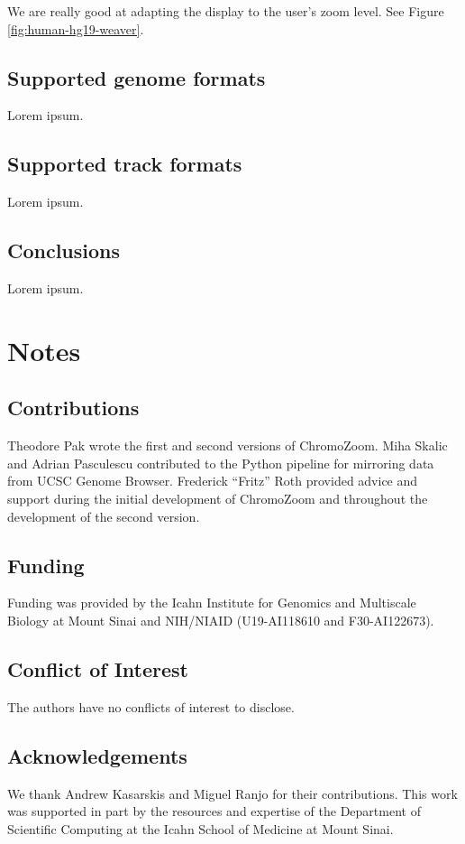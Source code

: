 We are really good at adapting the display to the user's zoom level. See Figure \ref{fig:human-hg19-weaver}.

\subsection{Supported genome formats}

Lorem ipsum.

\subsection{Supported track formats}

Lorem ipsum.

\subsection{Conclusions}

Lorem ipsum.

\section*{Notes}

\subsection{Contributions}

Theodore Pak wrote the first and second versions of ChromoZoom. Miha Skalic and Adrian Pasculescu contributed to the Python pipeline for mirroring data from UCSC Genome Browser. Frederick ``Fritz'' Roth provided advice and support during the initial development of ChromoZoom and throughout the development of the second version.

\subsection{Funding}

Funding was provided by the Icahn Institute for Genomics and Multiscale Biology at Mount Sinai and NIH/NIAID (U19-AI118610 and F30-AI122673).

\subsection{Conflict of Interest}

The authors have no conflicts of interest to disclose.

\subsection{Acknowledgements}

We thank Andrew Kasarskis and Miguel Ranjo for their contributions. This work was supported in part by the resources and expertise of the Department of Scientific Computing at the Icahn School of Medicine at Mount Sinai.
